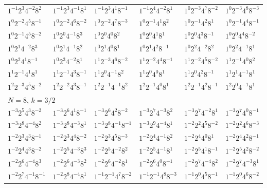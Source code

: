 \documentclass[12pt]{amsart}
\numberwithin{equation}{section}
\theoremstyle{plain}
\theoremstyle{definition}
\theoremstyle{remark}
\begin{document}
\begin{longtable}{llllll}
$1^{-1}2^{3}4^{-2}8^{2}$ & $1^{-1}2^{3}4^{-1}8^{1}$ & $1^{-1}2^{3}4^{1}8^{-1}$ & $1^{-1}2^{4}4^{-2}8^{1}$ & $1^{0}2^{-3}4^{7}8^{-2}$ & $1^{0}2^{-3}4^{8}8^{-3}$\\
$1^{0}2^{-2}4^{5}8^{-1}$ & $1^{0}2^{-2}4^{6}8^{-2}$ & $1^{0}2^{-2}4^{7}8^{-3}$ & $1^{0}2^{-1}4^{1}8^{2}$ & $1^{0}2^{-1}4^{2}8^{1}$ & $1^{0}2^{-1}4^{4}8^{-1}$\\
$1^{0}2^{-1}4^{5}8^{-2}$ & $1^{0}2^{0}4^{-1}8^{3}$ & $1^{0}2^{0}4^{0}8^{2}$ & $1^{0}2^{0}4^{1}8^{1}$ & $1^{0}2^{0}4^{3}8^{-1}$ & $1^{0}2^{0}4^{4}8^{-2}$\\
$1^{0}2^{1}4^{-2}8^{3}$ & $1^{0}2^{1}4^{-1}8^{2}$ & $1^{0}2^{1}4^{0}8^{1}$ & $1^{0}2^{1}4^{2}8^{-1}$ & $1^{0}2^{2}4^{-2}8^{2}$ & $1^{0}2^{2}4^{-1}8^{1}$\\
$1^{0}2^{2}4^{1}8^{-1}$ & $1^{0}2^{3}4^{-2}8^{1}$ & $1^{1}2^{-3}4^{6}8^{-2}$ & $1^{1}2^{-2}4^{4}8^{-1}$ & $1^{1}2^{-2}4^{5}8^{-2}$ & $1^{1}2^{-1}4^{0}8^{2}$\\
$1^{1}2^{-1}4^{1}8^{1}$ & $1^{1}2^{-1}4^{3}8^{-1}$ & $1^{1}2^{0}4^{-1}8^{2}$ & $1^{1}2^{0}4^{0}8^{1}$ & $1^{1}2^{0}4^{2}8^{-1}$ & $1^{1}2^{1}4^{-1}8^{1}$\\
$1^{2}2^{-3}4^{5}8^{-2}$ & $1^{2}2^{-2}4^{3}8^{-1}$ & $1^{2}2^{-1}4^{-1}8^{2}$ & $1^{2}2^{-1}4^{0}8^{1}$ & $1^{2}2^{-1}4^{2}8^{-1}$ & $1^{2}2^{0}4^{-1}8^{1}$\\
\midrule
\multicolumn{6}{l}{$N=8$, $k=3/2$}\\
$1^{-3}2^{5}4^{3}8^{-2}$ & $1^{-3}2^{6}4^{1}8^{-1}$ & $1^{-3}2^{6}4^{2}8^{-2}$ & $1^{-3}2^{7}4^{-3}8^{2}$ & $1^{-3}2^{7}4^{-2}8^{1}$ & $1^{-3}2^{7}4^{0}8^{-1}$\\
$1^{-3}2^{8}4^{-4}8^{2}$ & $1^{-3}2^{8}4^{-3}8^{1}$ & $1^{-3}2^{8}4^{-1}8^{-1}$ & $1^{-3}2^{9}4^{-4}8^{1}$ & $1^{-2}2^{2}4^{5}8^{-2}$ & $1^{-2}2^{2}4^{6}8^{-3}$\\
$1^{-2}2^{3}4^{3}8^{-1}$ & $1^{-2}2^{3}4^{4}8^{-2}$ & $1^{-2}2^{3}4^{5}8^{-3}$ & $1^{-2}2^{4}4^{-1}8^{2}$ & $1^{-2}2^{4}4^{0}8^{1}$ & $1^{-2}2^{4}4^{2}8^{-1}$\\
$1^{-2}2^{4}4^{3}8^{-2}$ & $1^{-2}2^{5}4^{-3}8^{3}$ & $1^{-2}2^{5}4^{-2}8^{2}$ & $1^{-2}2^{5}4^{-1}8^{1}$ & $1^{-2}2^{5}4^{1}8^{-1}$ & $1^{-2}2^{5}4^{2}8^{-2}$\\
$1^{-2}2^{6}4^{-4}8^{3}$ & $1^{-2}2^{6}4^{-3}8^{2}$ & $1^{-2}2^{6}4^{-2}8^{1}$ & $1^{-2}2^{6}4^{0}8^{-1}$ & $1^{-2}2^{7}4^{-4}8^{2}$ & $1^{-2}2^{7}4^{-3}8^{1}$\\
$1^{-2}2^{7}4^{-1}8^{-1}$ & $1^{-2}2^{8}4^{-4}8^{1}$ & $1^{-1}2^{-1}4^{7}8^{-2}$ & $1^{-1}2^{-1}4^{8}8^{-3}$ & $1^{-1}2^{0}4^{5}8^{-1}$ & $1^{-1}2^{0}4^{6}8^{-2}$\\

\end{longtable}
\end{document}
